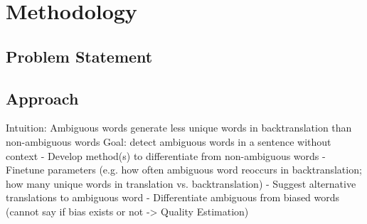 \chapter{Methodology}
\label{ch:Methodology}


\section{Problem Statement}
\label{sec:Methodology:Problem}

\section{Approach}
\label{sec:Methodology:Approach}

Intuition: Ambiguous words generate less unique words in backtranslation than non-ambiguous words
Goal: detect ambiguous words in a sentence without context
	- Develop method(s) to differentiate from non-ambiguous words
	- Finetune parameters (e.g. how often ambiguous word reoccurs in backtranslation; how many unique words in translation vs. backtranslation)
	- Suggest alternative translations to ambiguous word
    - Differentiate ambiguous from biased words (cannot say if bias exists or not -> Quality Estimation)